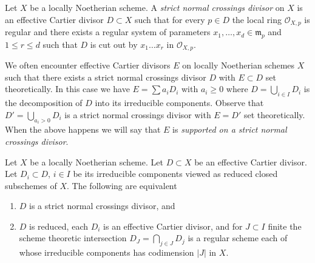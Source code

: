 \begin{definition}
\label{definition-strict-normal-crossings}
Let $X$ be a locally Noetherian scheme. A
{\it strict normal crossings divisor}
on $X$ is an effective Cartier divisor $D \subset X$ such that
for every $p \in D$ the local ring $\mathcal{O}_{X, p}$ is regular
and there exists a regular system of parameters
$x_1, \ldots, x_d \in \mathfrak m_p$ and $1 \leq r \leq d$
such that $D$ is cut out by $x_1 \ldots x_r$ in $\mathcal{O}_{X, p}$.
\end{definition}

\noindent
We often encounter effective Cartier divisors $E$ on locally Noetherian
schemes $X$ such that there exists a strict normal crossings divisor $D$
with $E \subset D$ set theoretically.
In this case we have
$E = \sum a_i D_i$ with $a_i \geq 0$ where $D = \bigcup_{i \in I} D_i$
is the decomposition of $D$ into its irreducible components.
Observe that $D' = \bigcup_{a_i > 0} D_i$ is a strict normal crossings
divisor with $E = D'$ set theoretically.
When the above happens we will say that
$E$ is {\it supported on a strict normal crossings divisor}.

\begin{lemma}
\label{lemma-strict-normal-crossings}
Let $X$ be a locally Noetherian scheme. Let $D \subset X$ be an
effective Cartier divisor. Let $D_i \subset D$, $i \in I$ be its
irreducible components viewed as reduced closed subschemes of $X$.
The following are equivalent
\begin{enumerate}
\item $D$ is a strict normal crossings divisor, and
\item $D$ is reduced, each $D_i$ is an effective Cartier divisor, and
for $J \subset I$ finite the scheme theoretic
intersection $D_J = \bigcap_{j \in J} D_j$ is a
regular scheme each of whose irreducible components has
codimension $|J|$ in $X$.
\end{enumerate}
\end{lemma}

